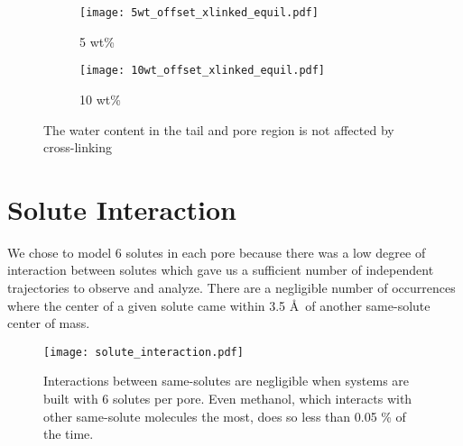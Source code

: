   \begin{figure}[!htb]
  \centering
  \begin{subfigure}{0.45\textwidth}
  \texttt{[image: 5wt\_offset\_xlinked\_equil.pdf]}
  \caption{5 wt\%}\label{S-fig:5wt_offset_xlinked_equil}
  \end{subfigure}
  \begin{subfigure}{0.45\textwidth}
  \texttt{[image: 10wt\_offset\_xlinked\_equil.pdf]}
  \caption{10 wt\%}\label{S-fig:10wt_offset_xlinked_equil}
  \end{subfigure}
  \caption{The water content in the tail and pore region is not affected
  by cross-linking}\label{S-fig:xlinked_solvation_equilibration}
  \end{figure}  
  
  \clearpage
  \section{Solute Interaction}\label{S-section:solute_interaction}
  
  We chose to model 6 solutes in each pore because there was a low degree of 
  interaction between solutes which gave us a sufficient number of independent 
  trajectories to observe and analyze. There are a negligible number of occurrences
  where the center of a given solute came within 3.5 \AA~of another same-solute
  center of mass.
  
  \begin{figure}[!htb]
  \centering
  \texttt{[image: solute\_interaction.pdf]}
  \caption{Interactions between same-solutes are negligible when systems are 
  built with 6 solutes per pore. Even methanol, which interacts with other same-solute
  molecules the most, does so less than 0.05 \% of the time.}\label{S-fig:solute_interaction}
  \end{figure}
  
